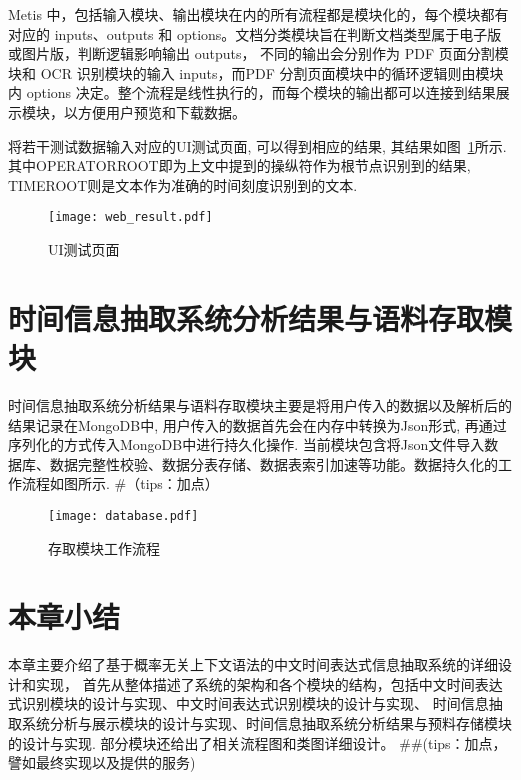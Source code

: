 Metis 中，包括输入模块、输出模块在内的所有流程都是模块化的，每个模块都有对应的 inputs、outputs 和 options。文档分类模块旨在判断文档类型属于电子版或图片版，判断逻辑影响输出 outputs，
不同的输出会分别作为 PDF 页面分割模块和 OCR 识别模块的输入 inputs，而PDF 分割页面模块中的循环逻辑则由模块内 options 决定。整个流程是线性执行的，而每个模块的输出都可以连接到结果展示模块，以方便用户预览和下载数据。

将若干测试数据输入对应的UI测试页面, 可以得到相应的结果, 其结果如图~\ref{fig:web_result}所示. 其中OPERATORROOT即为上文中提到的操纵符作为根节点识别到的结果, TIMEROOT则是文本作为准确的时间刻度识别到的文本.


\begin{figure}[h]
    \centering
    \texttt{[image: web\_result.pdf]}
    \caption{UI测试页面}
    \label{fig:web_result}
\end{figure}


\section{时间信息抽取系统分析结果与语料存取模块}


时间信息抽取系统分析结果与语料存取模块主要是将用户传入的数据以及解析后的结果记录在MongoDB中, 用户传入的数据首先会在内存中转换为Json形式, 再通过序列化的方式传入MongoDB中进行持久化操作.
当前模块包含将Json文件导入数据库、数据完整性校验、数据分表存储、数据表索引加速等功能。数据持久化的工作流程如图所示.
#（tips：加点）


\begin{figure}[h]
    \centering
    \texttt{[image: database.pdf]}
    \caption{存取模块工作流程}
    \label{fig:database}
\end{figure}






\section{本章小结}

本章主要介绍了基于概率无关上下文语法的中文时间表达式信息抽取系统的详细设计和实现，
首先从整体描述了系统的架构和各个模块的结构，包括中文时间表达式识别模块的设计与实现、中文时间表达式识别模块的设计与实现、
时间信息抽取系统分析与展示模块的设计与实现、时间信息抽取系统分析结果与预料存储模块的设计与实现.
部分模块还给出了相关流程图和类图详细设计。
##(tips：加点，譬如最终实现以及提供的服务)
